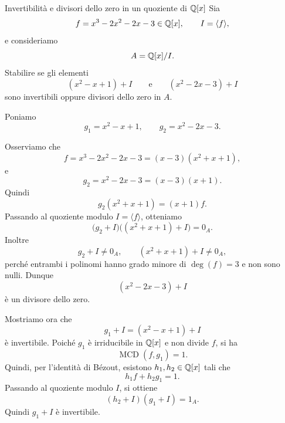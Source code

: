 \documentclass[a4paper]{article}
\begin{document}
\begin{radioactive}
\begin{snippetexercise}{Invertibilità e divisori dello zero in un quoziente di \(\mathbb{Q}[x]\)}
    Sia
    \[
        f=x^3-2x^2-2x-3\in \mathbb{Q}[x],
        \qquad
        I=\langle f \rangle,
    \]
    e consideriamo
    \[
        A=\mathbb{Q}[x]/I.
    \]
    Stabilire se gli elementi
    \[
        (x^2-x+1)+I
        \qquad
        \text{e}
        \qquad
        (x^2-2x-3)+I
    \]
    sono invertibili oppure divisori dello zero in \(A\).
\end{snippetexercise}
\end{radioactive}

\begin{radioactive}
\begin{snippetsolution}{}
    Poniamo
    \[
        g_1=x^2-x+1,
        \qquad
        g_2=x^2-2x-3.
    \]

    Osserviamo che
    \[
        f=x^3-2x^2-2x-3=(x-3)(x^2+x+1),
    \]
    e
    \[
        g_2=x^2-2x-3=(x-3)(x+1).
    \]
    Quindi
    \[
        g_2(x^2+x+1)=(x+1)f.
    \]
    Passando al quoziente modulo \(I=\langle f \rangle\), otteniamo
    \[
        \big(g_2+I\big)\big((x^2+x+1)+I\big)=0_A.
    \]
    Inoltre
    \[
        g_2+I\neq 0_A,
        \qquad
        (x^2+x+1)+I\neq 0_A,
    \]
    perché entrambi i polinomi hanno grado minore di \(\deg(f)=3\) e non sono nulli.
    Dunque
    \[
        (x^2-2x-3)+I
    \]
    è un divisore dello zero.

    Mostriamo ora che
    \[
        g_1+I=(x^2-x+1)+I
    \]
    è invertibile. Poiché \(g_1\) è irriducibile in \(\mathbb{Q}[x]\) e non divide \(f\), si ha
    \[
        \operatorname{MCD}(f,g_1)=1.
    \]
    Quindi, per l'identità di Bézout, esistono \(h_1,h_2\in \mathbb{Q}[x]\) tali che
    \[
        h_1f+h_2g_1=1.
    \]
    Passando al quoziente modulo \(I\), si ottiene
    \[
        (h_2+I)(g_1+I)=1_A.
    \]
    Quindi \(g_1+I\) è invertibile.


\end{snippetsolution}
\end{radioactive}
\end{document}
